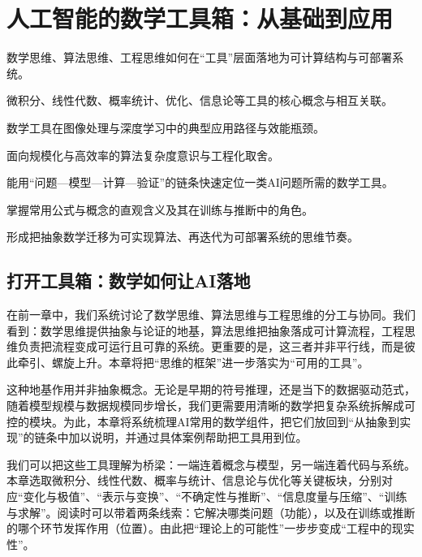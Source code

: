 
\chapter{人工智能的数学工具箱：从基础到应用}

\begin{introduction}[本章提要]
  \item 数学思维、算法思维、工程思维如何在“工具”层面落地为可计算结构与可部署系统。
  \item 微积分、线性代数、概率统计、优化、信息论等工具的核心概念与相互关联。
  \item 数学工具在图像处理与深度学习中的典型应用路径与效能瓶颈。
  \item 面向规模化与高效率的算法复杂度意识与工程化取舍。
\end{introduction}
\begin{introduction}
  \item 能用“问题—模型—计算—验证”的链条快速定位一类AI问题所需的数学工具。
  \item 掌握常用公式与概念的直观含义及其在训练与推断中的角色。
  \item 形成把抽象数学迁移为可实现算法、再迭代为可部署系统的思维节奏。
\end{introduction}

\section{打开工具箱：数学如何让AI落地}

在前一章中，我们系统讨论了数学思维、算法思维与工程思维的分工与协同。我们看到：数学思维提供抽象与论证的地基，算法思维把抽象落成可计算流程，工程思维负责把流程变成可运行且可靠的系统。更重要的是，这三者并非平行线，而是彼此牵引、螺旋上升。本章将把“思维的框架”进一步落实为“可用的工具”。

这种地基作用并非抽象概念。无论是早期的符号推理，还是当下的数据驱动范式，随着模型规模与数据规模同步增长，我们更需要用清晰的数学把复杂系统拆解成可控的模块。为此，本章将系统梳理AI常用的数学组件，把它们放回到“从抽象到实现”的链条中加以说明，并通过具体案例帮助把工具用到位。

我们可以把这些工具理解为桥梁：一端连着概念与模型，另一端连着代码与系统。本章选取微积分、线性代数、概率与统计、信息论与优化等关键板块，分别对应“变化与极值”、“表示与变换”、“不确定性与推断”、“信息度量与压缩”、“训练与求解”。阅读时可以带着两条线索：它解决哪类问题（功能），以及在训练或推断的哪个环节发挥作用（位置）。由此把“理论上的可能性”一步步变成“工程中的现实性”。


